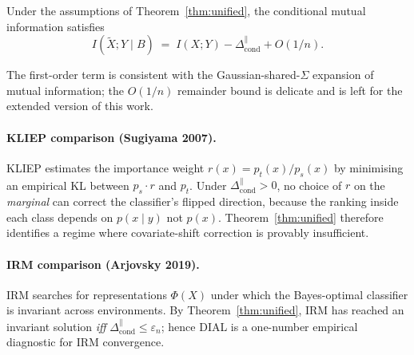 \begin{conjecture}
\label{conj:ib}
Under the assumptions of Theorem~\ref{thm:unified}, the conditional
mutual information satisfies
\[
   I(\tilde X;Y\mid B) \;=\; I(X;Y) - \Delta_{\text{cond}}^{\parallel}
   + O(1/n).
\]
\end{conjecture}

The first-order term is consistent with the Gaussian-shared-$\Sigma$
expansion of mutual information; the $O(1/n)$ remainder bound is
delicate and is left for the extended version of this work.

\paragraph{KLIEP comparison (Sugiyama 2007).}
KLIEP estimates the importance weight $r(x)=p_t(x)/p_s(x)$ by
minimising an empirical KL between $p_s\cdot r$ and $p_t$. Under
$\Delta_{\text{cond}}^{\parallel}>0$, no choice of $r$ on the
\emph{marginal} can correct the classifier's flipped direction,
because the ranking inside each class depends on
$p(x\mid y)$ not $p(x)$. Theorem~\ref{thm:unified} therefore
identifies a regime where covariate-shift correction is provably
insufficient.

\paragraph{IRM comparison (Arjovsky 2019).}
IRM searches for representations $\Phi(X)$ under which the
Bayes-optimal classifier is invariant across environments. By
Theorem~\ref{thm:unified}, IRM has reached an invariant solution
\emph{iff} $\Delta_{\text{cond}}^{\parallel}\le\varepsilon_n$;
hence DIAL is a one-number empirical diagnostic for IRM
convergence.

